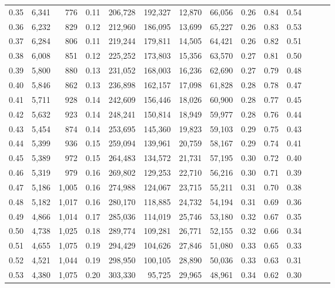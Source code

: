 \begin{tabular}{rrrrrrrrrrrrrr}
0.35 &  6,341 &    776 &  0.11 &  206,728 &  192,327 &  12,870 &  66,056 &  0.26 &  0.84 &      0.54 \\
0.36 &  6,232 &    829 &  0.12 &  212,960 &  186,095 &  13,699 &  65,227 &  0.26 &  0.83 &      0.53 \\
0.37 &  6,284 &    806 &  0.11 &  219,244 &  179,811 &  14,505 &  64,421 &  0.26 &  0.82 &      0.51 \\
0.38 &  6,008 &    851 &  0.12 &  225,252 &  173,803 &  15,356 &  63,570 &  0.27 &  0.81 &      0.50 \\
0.39 &  5,800 &    880 &  0.13 &  231,052 &  168,003 &  16,236 &  62,690 &  0.27 &  0.79 &      0.48 \\
0.40 &  5,846 &    862 &  0.13 &  236,898 &  162,157 &  17,098 &  61,828 &  0.28 &  0.78 &      0.47 \\
0.41 &  5,711 &    928 &  0.14 &  242,609 &  156,446 &  18,026 &  60,900 &  0.28 &  0.77 &      0.45 \\
0.42 &  5,632 &    923 &  0.14 &  248,241 &  150,814 &  18,949 &  59,977 &  0.28 &  0.76 &      0.44 \\
0.43 &  5,454 &    874 &  0.14 &  253,695 &  145,360 &  19,823 &  59,103 &  0.29 &  0.75 &      0.43 \\
0.44 &  5,399 &    936 &  0.15 &  259,094 &  139,961 &  20,759 &  58,167 &  0.29 &  0.74 &      0.41 \\
0.45 &  5,389 &    972 &  0.15 &  264,483 &  134,572 &  21,731 &  57,195 &  0.30 &  0.72 &      0.40 \\
0.46 &  5,319 &    979 &  0.16 &  269,802 &  129,253 &  22,710 &  56,216 &  0.30 &  0.71 &      0.39 \\
0.47 &  5,186 &  1,005 &  0.16 &  274,988 &  124,067 &  23,715 &  55,211 &  0.31 &  0.70 &      0.38 \\
0.48 &  5,182 &  1,017 &  0.16 &  280,170 &  118,885 &  24,732 &  54,194 &  0.31 &  0.69 &      0.36 \\
0.49 &  4,866 &  1,014 &  0.17 &  285,036 &  114,019 &  25,746 &  53,180 &  0.32 &  0.67 &      0.35 \\
0.50 &  4,738 &  1,025 &  0.18 &  289,774 &  109,281 &  26,771 &  52,155 &  0.32 &  0.66 &      0.34 \\
0.51 &  4,655 &  1,075 &  0.19 &  294,429 &  104,626 &  27,846 &  51,080 &  0.33 &  0.65 &      0.33 \\
0.52 &  4,521 &  1,044 &  0.19 &  298,950 &  100,105 &  28,890 &  50,036 &  0.33 &  0.63 &      0.31 \\
0.53 &  4,380 &  1,075 &  0.20 &  303,330 &   95,725 &  29,965 &  48,961 &  0.34 &  0.62 &      0.30 \\

\end{tabular}
